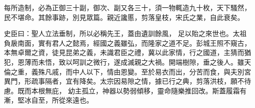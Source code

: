 \begin{pinyinscope}
 每所造制，必為正御三十副，御次、副又各三十，須一物輒造九十枚，天下騷然，民不堪命。其餘事跡，別見眾篇。親近讒慝，剪落皇枝，宋氏之業，自此衰矣。



 史臣曰：聖人立法垂制，所以必稱先王，蓋由遺訓餘風，
 足以貽之來世也。太祖負扆南面，實有君人之懿焉，經國之義雖弘，而隆家之道不足。彭城王照不窺古，本無卓爾之資，徒見昆弟之義，未識君臣之禮，冀以此家情，行之國道，主猜而猶犯，恩薄而未悟，致以呵訓之微行，遂成滅親之大禍。開端樹隙，垂之後人。雖天倫之重，義殊凡戚，而中人以下，情由恩變。至於易衣而出，分苦而食，與夫別宮異門，形疏事隔者，宜有降矣。太宗因易隙之情，據已行之典，剪落洪枝，願不待慮。既而本根無庇，
 幼主孤立，神器以勢弱傾移，靈命隨樂推回改。斯蓋履霜有漸，堅冰自至，所從來遠也。



\end{pinyinscope}